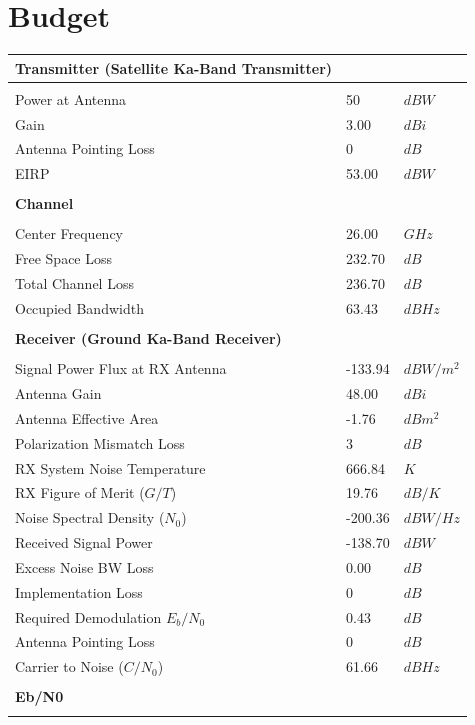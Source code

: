 \documentclass{article}
\begin{document}
\section{Budget}
\label{section::budget}
\begin{center}
  \begin{tabular}{p{3in}p{1in}l}
\textbf{Transmitter (Satellite Ka-Band Transmitter)} & & \\
\hline \\
Power at Antenna & 50 & $dBW$ \\
Gain & 3.00 & $dBi$ \\
Antenna Pointing Loss & 0 & $dB$ \\
EIRP & 53.00 & $dBW$ \\
\\
\textbf{Channel} & & \\
\hline \\
Center Frequency & 26.00 & $GHz$ \\
Free Space Loss & 232.70 & $dB$ \\
Total Channel Loss & 236.70 & $dB$ \\
Occupied Bandwidth & 63.43 & $dBHz$ \\
\\
\textbf{Receiver (Ground Ka-Band Receiver)} & & \\
\hline \\
Signal Power Flux at RX Antenna & -133.94 & $dBW/m^2$ \\
Antenna Gain & 48.00 & $dBi$ \\
Antenna Effective Area & -1.76 & $dBm^2$ \\
Polarization Mismatch Loss & 3 & $dB$ \\
RX System Noise Temperature & 666.84 & $K$ \\
RX Figure of Merit ($G/T$) & 19.76 & $dB/K$ \\
Noise Spectral Density ($N_0$) & -200.36 & $dBW/Hz$ \\
Received Signal Power & -138.70 & $dBW$ \\
Excess Noise BW Loss & 0.00 & $dB$ \\
Implementation Loss & 0 & $dB$ \\
Required Demodulation $E_b/N_0$ & 0.43 & $dB$ \\
Antenna Pointing Loss & 0 & $dB$ \\
Carrier to Noise ($C/N_0$) & 61.66 & $dBHz$ \\
\\
\textbf{Eb/N0} & & \\
\hline \\

\end{tabular}
\end{center}
\end{document}
